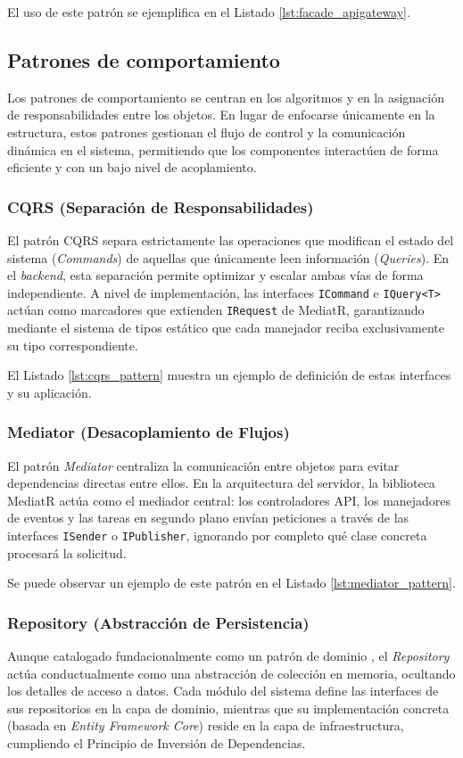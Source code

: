 El uso de este patrón se ejemplifica en el Listado \ref{lst:facade_apigateway}.

\subsection{Patrones de comportamiento}
Los patrones de comportamiento se centran en los algoritmos y en la asignación de responsabilidades entre los objetos. En lugar de enfocarse únicamente en la estructura, estos patrones gestionan el flujo de control y la comunicación dinámica en el sistema, permitiendo que los componentes interactúen de forma eficiente y con un bajo nivel de acoplamiento.

\subsubsection{CQRS (Separación de Responsabilidades)}
El patrón \ac{CQRS} \cite{fowler2007cqrs} separa estrictamente las operaciones que modifican el estado del sistema (\emph{Commands}) de aquellas que únicamente leen información (\emph{Queries}). En el \emph{backend}, esta separación permite optimizar y escalar ambas vías de forma independiente. A nivel de implementación, las interfaces \texttt{ICommand} e \texttt{IQuery<T>} actúan como marcadores que extienden \texttt{IRequest} de MediatR, garantizando mediante el sistema de tipos estático que cada manejador reciba exclusivamente su tipo correspondiente.

El Listado \ref{lst:cqrs_pattern} muestra un ejemplo de definición de estas interfaces y su aplicación.

\subsubsection{Mediator (Desacoplamiento de Flujos)}
El patrón \emph{Mediator} centraliza la comunicación entre objetos para evitar dependencias directas entre ellos. En la arquitectura del servidor, la biblioteca MediatR actúa como el mediador central: los controladores \ac{API}, los manejadores de eventos y las tareas en segundo plano envían peticiones a través de las interfaces \texttt{ISender} o \texttt{IPublisher}, ignorando por completo qué clase concreta procesará la solicitud.

Se puede observar un ejemplo de este patrón en el Listado \ref{lst:mediator_pattern}.

\subsubsection{Repository (Abstracción de Persistencia)}
Aunque catalogado fundacionalmente como un patrón de dominio \cite{evans2004ddd}, el \emph{Repository} actúa conductualmente como una abstracción de colección en memoria, ocultando los detalles de acceso a datos. Cada módulo del sistema define las interfaces de sus repositorios en la capa de dominio, mientras que su implementación concreta (basada en \emph{Entity Framework Core}) reside en la capa de infraestructura, cumpliendo el Principio de Inversión de Dependencias.

